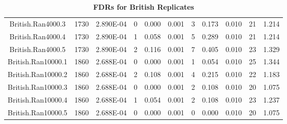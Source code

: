 \documentclass[12pt, a4paper]{article}
\begin{document}
\begin{landscape}
\begin{table}[ht]
\begin{tabular}{ccccccccccc}
  British.Ran4000.3 & 1730 & 2.890E-04 & 0 & 0.000 & 0.001 & 3 & 0.173 & 0.010 & 21 & 1.214 \\
  British.Ran4000.4 & 1730 & 2.890E-04 & 1 & 0.058 & 0.001 & 5 & 0.289 & 0.010 & 21 & 1.214 \\
  British.Ran4000.5 & 1730 & 2.890E-04 & 2 & 0.116 & 0.001 & 7 & 0.405 & 0.010 & 23 & 1.329 \\
  British.Ran10000.1 & 1860 & 2.688E-04 & 0 & 0.000 & 0.001 & 1 & 0.054 & 0.010 & 25 & 1.344 \\
  British.Ran10000.2 & 1860 & 2.688E-04 & 2 & 0.108 & 0.001 & 4 & 0.215 & 0.010 & 22 & 1.183 \\
  British.Ran10000.3 & 1860 & 2.688E-04 & 0 & 0.000 & 0.001 & 2 & 0.108 & 0.010 & 20 & 1.075 \\
  British.Ran10000.4 & 1860 & 2.688E-04 & 1 & 0.054 & 0.001 & 2 & 0.108 & 0.010 & 23 & 1.237 \\
  British.Ran10000.5 & 1860 & 2.688E-04 & 0 & 0.000 & 0.001 & 0 & 0.000 & 0.010 & 20 & 1.075 \\
   \hline
\end{tabular}
\caption[TBD]{\textbf{FDRs for British Replicates}}
\label{InterPath-Supp-Tables-BritReps-FDRs-pt1}
\end{table}
\end{landscape}
\clearpage
\addtocounter{table}{-1}
\end{document}
